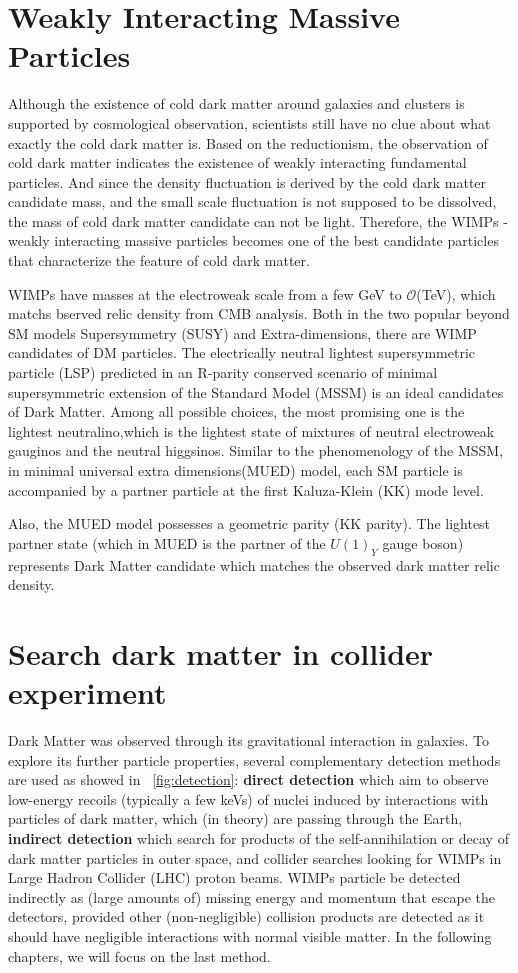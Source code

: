 \section{ Weakly Interacting Massive Particles}
Although the existence of cold dark matter around galaxies and clusters is supported by cosmological observation,
 scientists still have no clue about what exactly the cold dark matter is. Based on the reductionism, the observation of 
cold dark matter indicates the existence of weakly interacting fundamental particles. 
And since the density fluctuation is derived by the cold dark matter candidate mass, and the small scale fluctuation is not supposed to be dissolved, 
the mass of cold dark matter candidate can not be light. 
Therefore, the WIMPs - weakly interacting massive particles becomes one of the best candidate particles that characterize the feature of cold dark matter. 
					

WIMPs have masses at the electroweak scale from a few GeV to $\mathcal{O}$(TeV), which matchs bserved relic density from CMB analysis.  Both in the two popular beyond SM models Supersymmetry (SUSY) and Extra-dimensions, there are WIMP candidates of DM particles.							
The electrically neutral lightest supersymmetric particle (LSP) predicted in an R-parity conserved scenario of minimal supersymmetric extension of the Standard Model (MSSM) is an ideal candidates of Dark Matter.  Among all possible choices, the most promising one is the lightest neutralino,which is the lightest state of mixtures of neutral electroweak gauginos and the neutral higgsinos. \cite{Feng:2010gw}	 						
Similar to the phenomenology of the MSSM, in minimal universal extra dimensions(MUED) model, each SM particle is accompanied by a partner particle at the first Kaluza-Klein (KK)  mode level.

Also, the MUED model possesses a geometric parity (KK
parity). The lightest partner state (which in MUED is the partner of the $U(1)_Y$ gauge boson) represents
Dark Matter candidate which matches the observed dark matter relic density.\cite{SERVANT2003391}

\section{ Search dark matter in collider experiment}
Dark Matter was observed through its gravitational interaction in galaxies. To explore  its further particle properties,
 several complementary detection methods are used as showed in ~\ref{fig:detection}\cite{Undagoitia_2015}: \textbf{direct detection} which aim to observe low-energy recoils (typically a few keVs) 
of nuclei induced by interactions with particles of dark matter, which (in theory) are passing through the Earth,
 \textbf{indirect detection} which search for products of the self-annihilation or decay of dark matter particles in outer space,
 and collider searches looking for WIMPs in Large Hadron Collider (LHC) proton beams. WIMPs particle be detected indirectly as 
(large amounts of) missing energy and momentum that escape the detectors, provided other (non-negligible) collision products are detected as 
it should have negligible interactions with normal visible matter. In the following chapters, we will focus on the last method.			

